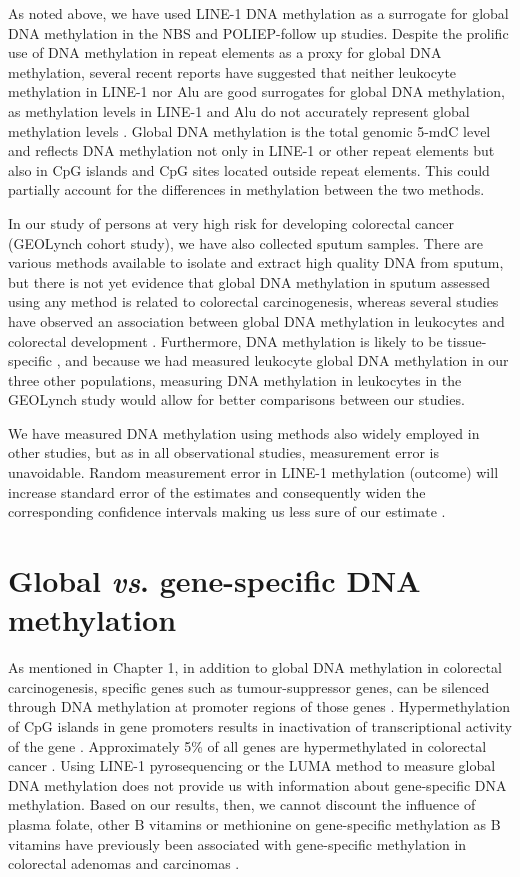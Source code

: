 \noindent As noted above, we have used LINE-1 DNA methylation as a surrogate for global DNA methylation in the NBS and POLIEP-follow up studies. Despite the prolific use of DNA methylation in repeat elements as a proxy for global DNA methylation, several recent reports have suggested that neither leukocyte methylation in LINE-1 nor Alu are good surrogates for global DNA methylation, as methylation levels in LINE-1 and Alu do not accurately represent global methylation levels \cite{c734,c753}. Global DNA methylation is the total genomic 5-mdC level and reflects DNA methylation not only in LINE-1 or other repeat elements but also in CpG islands and CpG sites located outside repeat elements. This could partially account for the differences in methylation between the two methods. 
 
\noindent In our study of persons at very high risk for developing colorectal cancer (GEOLynch cohort study), we have also collected sputum samples. There are various methods available to isolate and extract high quality DNA from sputum, but there is not yet evidence that global DNA methylation in sputum assessed using any method is related to colorectal carcinogenesis, whereas several studies have observed an association between global DNA methylation in leukocytes and colorectal development \cite{c754}. Furthermore, DNA methylation is likely to be tissue-specific \cite{c734,c755}, and because we had measured leukocyte global DNA methylation in our three other populations, measuring DNA methylation in leukocytes in the GEOLynch study would allow for better comparisons between our studies. 
 
\noindent We have measured DNA methylation using methods also widely employed in other studies, but as in all observational studies, measurement error is unavoidable. Random measurement error in LINE-1 methylation (outcome) will increase standard error of the estimates and consequently widen the corresponding confidence intervals making us less sure of our estimate \cite{c743,c744}. 
 
\section{Global \emph{vs}. gene-specific DNA methylation} %
\noindent As mentioned in Chapter 1, in addition to global DNA methylation in colorectal carcinogenesis, specific genes such as tumour-suppressor genes, can be silenced through DNA methylation at promoter regions of those genes \cite{c756,c757}. Hypermethylation of CpG islands in gene promoters results in inactivation of transcriptional activity of the gene \cite{c758}. Approximately 5\% of all genes are hypermethylated in colorectal cancer \cite{c759}. Using LINE-1 pyrosequencing or the LUMA method to measure global DNA methylation does not provide us with information about gene-specific DNA methylation. Based on our results, then, we cannot discount the influence of plasma folate, other B vitamins or methionine on gene-specific methylation as B vitamins have previously been associated with gene-specific methylation in colorectal adenomas \cite{c760} and carcinomas \cite{c761}. 
 
